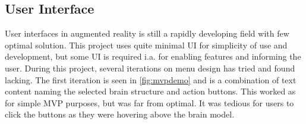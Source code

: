 


\subsection{User Interface}

User interfaces in augmented reality is still a rapidly developing field with few optimal solution. This project uses quite minimal UI for simplicity of use and development, but some UI is required i.a. for enabling features and informing the user. During this project, several iterations on menu design has tried and found lacking. The first iteration is seen in \autoref{fig:mvpdemo} and is a combination of text content naming the selected brain structure and action buttons. This worked as for simple MVP purposes, but was far from optimal. It was tedious for users to click the buttons as they were hovering above the brain model. 

